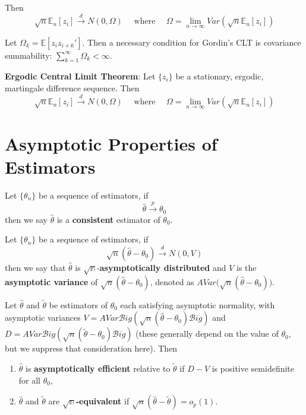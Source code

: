 \documentclass[12pt,]{book}
\providecommand{\tightlist}{%
  \setlength{\itemsep}{0pt}\setlength{\parskip}{0pt}}
\begin{document}
Then
\[
        \sqrt{n} \mathbb{E}_n [z_i] \overset{d}{\to} N(0,\Omega) \quad  \text{ where } \quad  \Omega = \lim _ {n \to \infty} Var(\sqrt{n} \mathbb{E}_n [z_i])
\]

Let \(\Omega_k = \mathbb{E}[ z_i z _ {i+k}']\). Then a necessary condition for Gordin's CLT is covariance summability: \(\sum _ {k=1}^\infty \Omega_k < \infty\).

\textbf{Ergodic Central Limit Theorem}:
Let \(\{z_i\}\) be a stationary, ergodic, martingale difference sequence. Then
\[
    \sqrt{n} \mathbb{E}_n [z_i] \overset{d}{\to} N(0,\Omega) \quad  \text{ where } \quad  \Omega = \lim _ {n \to \infty} Var(\sqrt{n}\mathbb{E}_n[z_i])
\]

\hypertarget{asymptotic-properties-of-estimators}{%
\section{Asymptotic Properties of Estimators}\label{asymptotic-properties-of-estimators}}

Let \(\{ \theta_n \}\) be a sequence of estimators, if
\[
    \hat{\theta} \overset{p}{\to} \theta_0
\]
then we say \(\hat{\theta}\) is a \textbf{consistent} estimator of \(\theta_0\).

Let \(\{ \theta_n \}\) be a sequence of estimators, if
\[
    \sqrt{n} (\hat{\theta} - \theta_0) \overset{d}{\to} N(0,V)
\]
then we say that \(\hat{\theta}\) is \(\mathbb{\sqrt{n}}\)-\textbf{asymptotically distributed} and \(V\) is the \textbf{asymptotic variance} of \(\sqrt{n} (\hat{\theta} - \theta_0)\), denoted as \(AVar \Big( \sqrt{n} (\hat{\theta} - \theta_0) \Big)\).

Let \(\hat{\theta}\) and \(\tilde{\theta}\) be estimators of \(\theta_0\) each satisfying asymptotic normality, with asymptotic variances \(V = AVar \mathcal{B}ig( \sqrt{n} (\hat{\theta} - \theta_0) \mathcal{B}ig)\) and \(D = AVar \mathcal{B}ig( \sqrt{n} (\tilde{\theta} - \theta_0) \mathcal{B}ig)\) (these generally depend on the value of \(\theta_0\), but we suppress that consideration here). Then

\begin{enumerate}
\def\labelenumi{\arabic{enumi}.}
\tightlist
\item
  \(\hat{\theta}\) is \textbf{asymptotically efficient} relative to \(\tilde{\theta}\) if \(D-V\) is positive semidefinite for all \(\theta_0\),\\
\item
  \(\hat{\theta}\) and \(\tilde{\theta}\) are \(\mathbb{\sqrt{n}}\)\textbf{-equivalent} if \(\sqrt{n}(\hat{\theta} - \tilde{\theta}) = o_p(1)\).
\end{enumerate}
\end{document}
